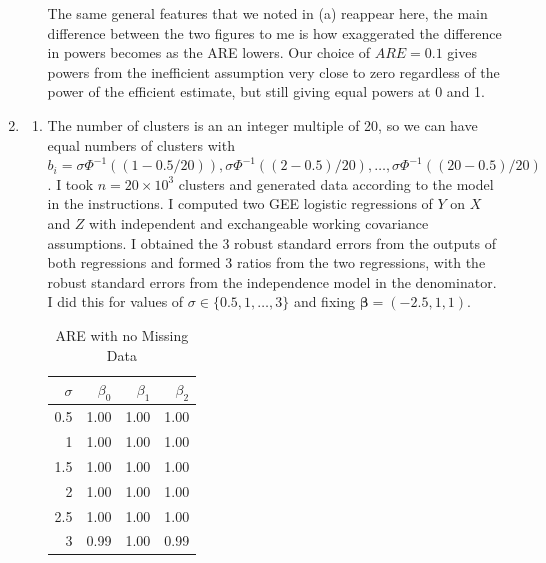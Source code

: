 \documentclass[11pt]{article}
\begin{document}
\begin{enumerate}
\begin{enumerate}
\begin{figure}[H]
			\end{figure}
		The same general features that we noted in (a) reappear here, the main difference between the two figures to me is how exaggerated the difference in powers becomes as the ARE lowers. Our choice of $ARE=0.1$ gives powers from the inefficient assumption very close to zero regardless of the power of the efficient estimate, but still giving equal powers at 0 and 1.
		\end{enumerate}
	\item
		\begin{enumerate}
		\item The number of clusters is an an integer multiple of 20, so we can have equal numbers of clusters with $b_i = \sigma\Phi^{-1}((1-0.5/20)),\sigma\Phi^{-1}((2-0.5)/20),\dotsc,\sigma\Phi^{-1}((20-0.5)/20)$. I took $n = 20\times10^3$ clusters and generated data according to the model in the instructions. I computed two GEE logistic regressions of $Y$ on $X$ and $Z$ with independent and exchangeable working covariance assumptions. I obtained the 3 robust standard errors from the outputs of both regressions and formed 3 ratios from the two regressions, with the robust standard errors from the independence model in the denominator. I did this for values of $\sigma\in\{0.5,1,\dotsc,3\}$ and fixing $\bm{\beta} = (-2.5,1,1)$.
				\begin{table}[H]
				\centering
				\begin{tabular}{|r||r|r|r|}
				  \hline
				 $\sigma$ & $\beta_0$ & $\beta_1$ & $\beta_2$ \\ 
				  \hline
				0.5 & 1.00 & 1.00 & 1.00 \\ 
				  1 & 1.00 & 1.00 & 1.00 \\ 
				 1.5 & 1.00 & 1.00 & 1.00 \\ 
				  2 & 1.00 & 1.00 & 1.00 \\ 
				  2.5 & 1.00 & 1.00 & 1.00 \\ 
				  3 & 0.99 & 1.00 & 0.99 \\ 
				   \hline
				\end{tabular}
				\caption{ARE with no Missing Data}
				\end{table}
			

\end{enumerate}
\end{enumerate}
\end{document}
